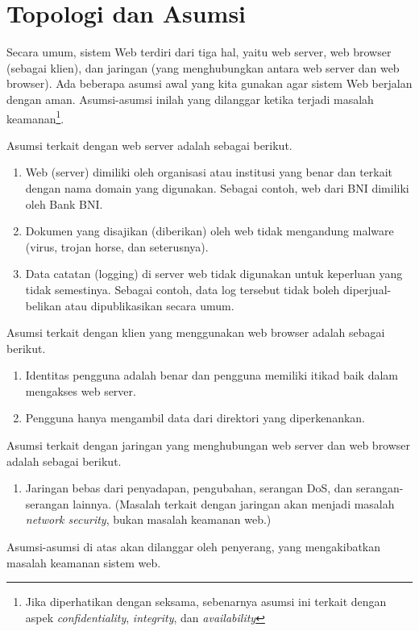 \section{Topologi dan Asumsi}
Secara umum, sistem Web terdiri dari tiga hal, yaitu web server, web browser
(sebagai klien), dan jaringan (yang menghubungkan antara web server dan web 
browser). Ada beberapa asumsi awal yang kita gunakan agar sistem Web berjalan
dengan aman. Asumsi-asumsi inilah yang dilanggar ketika terjadi masalah
keamanan\footnote{Jika diperhatikan dengan seksama, sebenarnya asumsi ini
terkait dengan aspek {\em confidentiality}, {\em integrity}, dan {\em
availability}}.

Asumsi terkait dengan web server adalah sebagai berikut.

\begin{enumerate}
\item Web (server) dimiliki oleh organisasi atau institusi yang benar dan
terkait dengan nama domain yang digunakan. Sebagai contoh, web dari BNI
dimiliki oleh Bank BNI.
\item Dokumen yang disajikan (diberikan) oleh web tidak mengandung malware
(virus, trojan horse, dan seterusnya).
\item Data catatan (logging) di server web tidak digunakan untuk keperluan yang
tidak semestinya. Sebagai contoh, data log tersebut tidak boleh
diperjual-belikan atau dipublikasikan secara umum.
\end{enumerate}

Asumsi terkait dengan klien yang menggunakan web browser adalah sebagai
berikut.
\begin{enumerate}
   \item Identitas pengguna adalah benar dan pengguna memiliki itikad baik
      dalam mengakses web server.
   \item Pengguna hanya mengambil data dari direktori yang diperkenankan.
\end{enumerate}

Asumsi terkait dengan jaringan yang menghubungan web server dan web browser
adalah sebagai berikut.
\begin{enumerate}
   \item Jaringan bebas dari penyadapan, pengubahan, serangan DoS, dan
      serangan-serangan lainnya. (Masalah terkait dengan jaringan akan menjadi
      masalah {\em network security}, bukan masalah keamanan web.)
\end{enumerate}

Asumsi-asumsi di atas akan dilanggar oleh penyerang, yang mengakibatkan masalah
keamanan sistem web.

